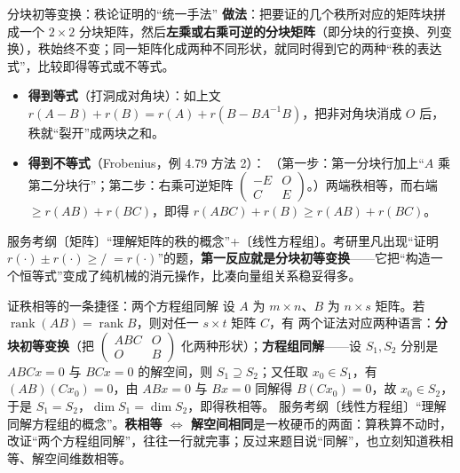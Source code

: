 \begin{fdeep}{分块初等变换：秩论证明的“统一手法”}
\textbf{做法}：把要证的几个秩所对应的矩阵块拼成一个 $2\times2$ 分块矩阵，然后\textbf{左乘或右乘可逆的分块矩阵}（即分块的行变换、列变换），秩始终不变；同一矩阵化成两种不同形状，就同时得到它的两种“秩的表达式”，比较即得等式或不等式。
\begin{itemize}[leftmargin=2.2em,itemsep=0.22em]
\item \textbf{得到等式}（打洞成对角块）：如上文 $r(A-B)+r(B)=r(A)+r(B-BA^{-1}B)$，把非对角块消成 $O$ 后，秩就“裂开”成两块之和。
\item \textbf{得到不等式}（Frobenius，例 4.79 方法 2）：
（第一步：第一分块行加上“$A$ 乘第二分块行”；第二步：右乘可逆矩阵 $\begin{pmatrix}-E&O\\ C&E\end{pmatrix}$。）两端秩相等，而右端 $\ge r(AB)+r(BC)$，即得 $r(ABC)+r(B)\ge r(AB)+r(BC)$。
\end{itemize}
\fbref{}服务考纲〔矩阵〕“理解矩阵的秩的概念”+〔线性方程组〕。考研里凡出现“证明 $r(\cdot)\pm r(\cdot)\ge/\;=r(\cdot)$”的题，\textbf{第一反应就是分块初等变换}——它把“构造一个恒等式”变成了纯机械的消元操作，比凑向量组关系稳妥得多。
\end{fdeep}

\begin{fdeep}{证秩相等的一条捷径：两个方程组同解}
设 $A$ 为 $m\times n$、$B$ 为 $n\times s$ 矩阵。若 $\operatorname{rank}(AB)=\operatorname{rank}B$，则对任一 $s\times t$ 矩阵 $C$，有
两个证法对应两种语言：\textbf{分块初等变换}（把 $\begin{pmatrix}ABC&O\\ O&B\end{pmatrix}$ 化两种形状）；\textbf{方程组同解}——设 $S_1,S_2$ 分别是 $ABCx=0$ 与 $BCx=0$ 的解空间，则 $S_1\supseteq S_2$；又任取 $x_0\in S_1$，有 $(AB)(Cx_0)=0$，由 $ABx=0$ 与 $Bx=0$ 同解得 $B(Cx_0)=0$，故 $x_0\in S_2$，于是 $S_1=S_2$，$\dim S_1=\dim S_2$，即得秩相等。
\fbref{}服务考纲〔线性方程组〕“理解同解方程组的概念”。\textbf{秩相等 $\Longleftrightarrow$ 解空间相同}是一枚硬币的两面：算秩算不动时，改证“两个方程组同解”，往往一行就完事；反过来题目说“同解”，也立刻知道秩相等、解空间维数相等。
\end{fdeep}

